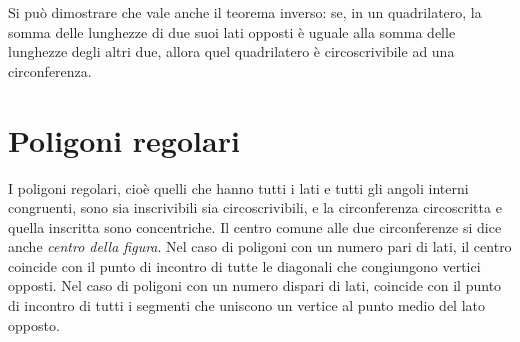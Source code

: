 Si può dimostrare che vale anche il teorema inverso: se, in un 
quadrilatero, la somma delle lunghezze di due suoi lati opposti è uguale alla 
somma 
delle lunghezze degli altri due, allora quel quadrilatero è circoscrivibile ad 
una circonferenza.

\section{Poligoni regolari}\label{sect:poligoni_regolari}

I poligoni regolari, cioè quelli che hanno tutti i lati e tutti gli 
angoli interni congruenti, sono sia inscrivibili sia circoscrivibili, 
e la circonferenza circoscritta e quella inscritta sono concentriche.
Il centro comune alle due circonferenze si dice anche \emph{centro 
della figura}.
Nel caso di poligoni con un numero pari di lati, il centro coincide 
con il punto di incontro di tutte le diagonali che congiungono 
vertici opposti. 
Nel caso di poligoni con un numero dispari di lati, coincide con il 
punto di incontro di tutti i segmenti che uniscono un vertice al 
punto medio del lato opposto.


\begin{inaccessibleblock}
 \begin{figure}[!htb]
  \begin{center}
    \begin{minipage}{0.45\textwidth}
      \centering
      
    \end{minipage}
    \hspace{0.03\textwidth}  
    \begin{minipage}{0.45\textwidth}
      \centering
      
    \end{minipage}
  \end{center}
\end{figure}
\end{inaccessibleblock}

\begin{inaccessibleblock}
 \begin{figure}[!htb]
  \begin{center}
    \begin{minipage}{0.45\textwidth}
      \centering
      
    \end{minipage}
    \hspace{0.03\textwidth}  
    \begin{minipage}{0.45\textwidth}
      \centering
      
    \end{minipage}
  \end{center}
\end{figure}
\end{inaccessibleblock}

